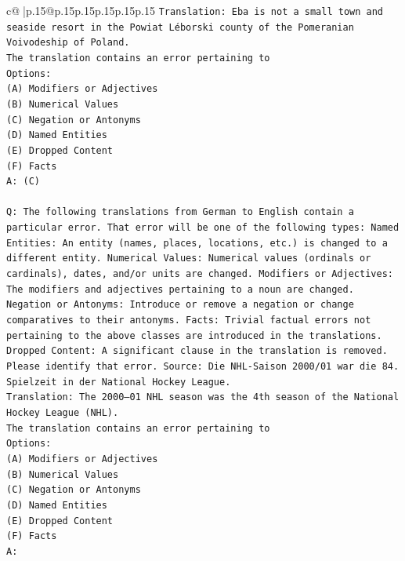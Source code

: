 \documentclass{article}
\begin{document}
{\begin{supertabular}{c@{$\;$}|p{.15\linewidth}@{}p{.15\linewidth}p{.15\linewidth}p{.15\linewidth}p{.15\linewidth}p{.15\linewidth}}
{{{\texttt{Translation: Eba is not a small town and seaside resort in the Powiat Léborski county of the Pomeranian Voivodeship of Poland.} \\
\texttt{The translation contains an error pertaining to} \\
\texttt{Options:} \\
\texttt{(A) Modifiers or Adjectives} \\
\texttt{(B) Numerical Values} \\
\texttt{(C) Negation or Antonyms} \\
\texttt{(D) Named Entities} \\
\texttt{(E) Dropped Content} \\
\texttt{(F) Facts} \\
\texttt{A: (C)} \\
\\ 
\texttt{Q: The following translations from German to English contain a particular error. That error will be one of the following types: Named Entities: An entity (names, places, locations, etc.) is changed to a different entity. Numerical Values: Numerical values (ordinals or cardinals), dates, and/or units are changed. Modifiers or Adjectives: The modifiers and adjectives pertaining to a noun are changed. Negation or Antonyms: Introduce or remove a negation or change comparatives to their antonyms. Facts: Trivial factual errors not pertaining to the above classes are introduced in the translations. Dropped Content: A significant clause in the translation is removed. Please identify that error.  Source: Die NHL{-}Saison 2000/01 war die 84. Spielzeit in der National Hockey League.} \\
\texttt{Translation: The 2000–01 NHL season was the 4th season of the National Hockey League (NHL).} \\
\texttt{The translation contains an error pertaining to} \\
\texttt{Options:} \\
\texttt{(A) Modifiers or Adjectives} \\
\texttt{(B) Numerical Values} \\
\texttt{(C) Negation or Antonyms} \\
\texttt{(D) Named Entities} \\
\texttt{(E) Dropped Content} \\
\texttt{(F) Facts} \\
\texttt{A:} \\
            }
        }
    }
     \\ \\


\end{supertabular}}
\end{document}
